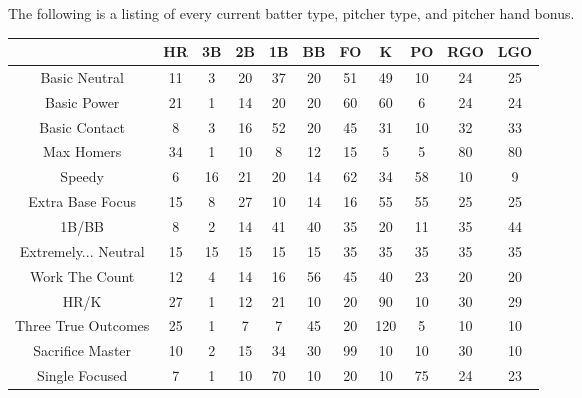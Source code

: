 
The following is a listing of every current batter type, pitcher type, and pitcher hand bonus. 
\begin{center}
	\begin{tabular}{|c|c|c|c|c|c|c|c|c|c|c|}
		\hline
		                     & HR & 3B & 2B & 1B & BB & FO & K   & PO & RGO & LGO    \\
		\hline 
		Basic Neutral        & 11 & 3  & 20 & 37 & 20 & 51 & 49  & 10 & 24  & 25     \\
		\hline
		Basic Power          & 21 & 1  & 14 & 20 & 20 & 60 & 60  & 6  & 24  & 24     \\
		\hline
		Basic Contact        & 8  & 3  & 16 & 52 & 20 & 45 & 31  & 10 & 32  & 33     \\
		\hline
		Max Homers           & 34 & 1  & 10  & 8  & 12  & 15 & 5   & 5  & 80  & 80     \\
		\hline
		Speedy               & 6  & 16 & 21 & 20 & 14 & 62 & 34  & 58 & 10  & 9      \\
		\hline
		Extra Base Focus     & 15 & 8  & 27 & 10 & 14  & 16 & 55  & 55 & 25  & 25     \\
		\hline
		1B/BB                & 8  & 2  & 14 & 41 & 40 & 35 & 20  & 11  & 35  & 44     \\
		\hline
		Extremely... Neutral & 15 & 15 & 15 & 15 & 15 & 35 & 35  & 35 & 35  & 35     \\
		\hline
		Work The Count       & 12 & 4  & 14 & 16 & 56 & 45 & 40  & 23 & 20  & 20     \\
		\hline
		HR/K                 & 27 & 1  & 12 & 21 & 10 & 20 & 90  & 10  & 30  & 29     \\
		\hline
		Three True Outcomes  & 25 & 1  & 7  & 7 & 45 & 20 & 120 & 5  & 10  & 10     \\
		\hline
		Sacrifice Master     & 10 & 2  & 15 & 34 & 30 & 99 & 10  & 10 & 30  & 10     \\
		\hline
		Single Focused       & 7 & 1  & 10 & 70 & 10 & 20 & 10  & 75 & 24  & 23     \\
		\hline
	\end{tabular}
\end{center}

